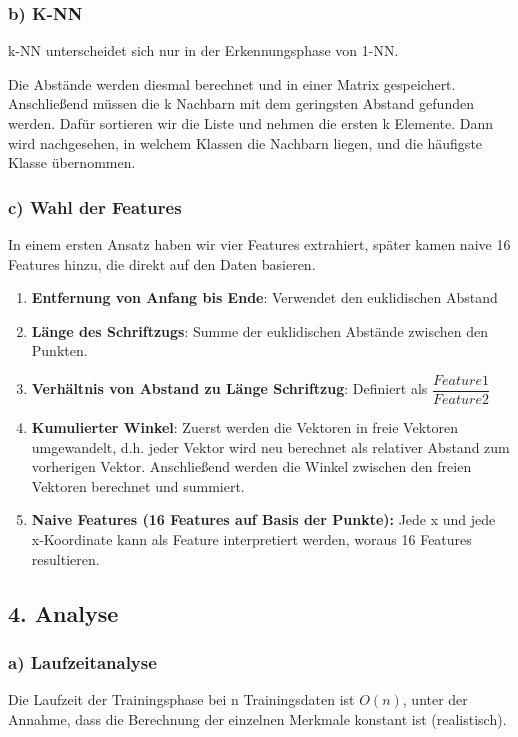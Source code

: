 \documentclass{article}
\begin{document}
			\subsubsection*{b) K-NN}
				
				k-NN unterscheidet sich nur in der Erkennungsphase von 1-NN.
				
				Die Abstände werden diesmal berechnet und in einer Matrix gespeichert.
				Anschließend müssen die k Nachbarn mit dem geringsten Abstand gefunden werden. Dafür sortieren wir die Liste und nehmen die ersten k Elemente.
				Dann wird nachgesehen, in welchem Klassen die Nachbarn liegen, und die häufigste Klasse übernommen.
				
			\subsubsection*{c) Wahl der Features}
				In einem ersten Ansatz haben wir vier Features extrahiert, später kamen naive 16 Features hinzu, die direkt auf den Daten basieren.
				\begin{enumerate}
					\item \textbf{Entfernung von Anfang bis Ende}: Verwendet den euklidischen Abstand
					\item \textbf{Länge des Schriftzugs}: Summe der euklidischen Abstände zwischen den Punkten.
					\item \textbf{Verhältnis von Abstand zu Länge Schriftzug}: Definiert als  $ \dfrac{Feature 1}{Feature 2} $
					\item \textbf{Kumulierter Winkel}: Zuerst werden die Vektoren in freie Vektoren umgewandelt, d.h. jeder Vektor wird neu berechnet als relativer Abstand zum vorherigen Vektor. Anschließend werden die Winkel zwischen den freien Vektoren berechnet und summiert.
					\item \textbf{Naive Features (16 Features auf Basis der Punkte):} Jede x und jede x-Koordinate kann als Feature interpretiert werden, woraus 16 Features resultieren.
				\end{enumerate}
				
			
		\subsection*{4. Analyse}
			\subsubsection*{a) Laufzeitanalyse}
				Die Laufzeit der Trainingsphase bei n Trainingsdaten ist $ O(n) $, unter der Annahme, dass die Berechnung der einzelnen Merkmale konstant ist (realistisch).\\
				
\end{document}
